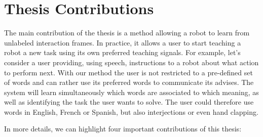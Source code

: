 \section{Thesis Contributions}

The main contribution of the thesis is a method allowing a robot to learn from unlabeled interaction frames. In practice, it allows a user to start teaching a robot a new task using its own preferred teaching signals. For example, let's consider a user providing, using speech, instructions to a robot about what action to perform next. With our method the user is not restricted to a pre-defined set of words and can rather use its preferred words to communicate its advises. The system will learn simultaneously which words are associated to which meaning, as well as identifying the task the user wants to solve. The user could therefore use words in English, French or Spanish, but also interjections or even hand clapping.

In more details, we can highlight four important contributions of this thesis:

